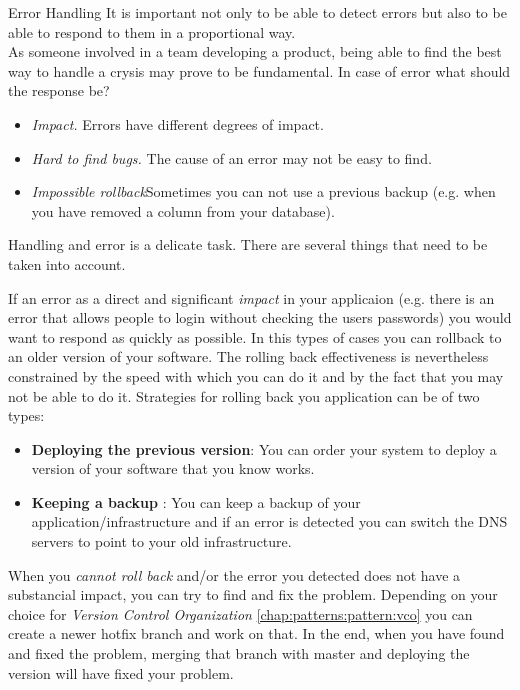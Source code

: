 \begin{pattern}{Error Handling} \label{chap:patterns:pattern:errorhandling}
    \context
    It is important not only to be able to detect errors but also to be able to respond to them in a proportional way. \\
    As someone involved in a team developing a product, being able to find the best way to handle a crysis may prove to be fundamental.
    \problem
    In case of error what should the response be?
    \forces
    \begin{itemize}
        \item \textit{Impact.} Errors have different degrees of impact.
        \item \textit{Hard to find bugs.} The cause of an error may not be easy to find.
        \item \textit{Impossible rollback}Sometimes you can not use a previous backup (e.g. when you have removed a column from your database).
    \end{itemize}

    \solution
    Handling and error is a delicate task. There are several things that need to be taken into account.

    If an error as a direct and significant \textit{impact} in your applicaion (e.g. there is an error that allows people to login without checking the users passwords) you would want to respond as quickly as possible. In this types of cases you can rollback to an older version of your software. The rolling back effectiveness is nevertheless constrained by the speed with which you can do it and by the fact that you may not be able to do it. Strategies for rolling back you application can be of two types:
        \begin{itemize}
            \item \textbf{Deploying the previous version}: You can order your system to deploy a version of your software that you know works.
            \item \textbf{Keeping a backup} : You can keep a backup of your application/infrastructure and if an error is detected you can switch the DNS servers to point to your old infrastructure.
        \end{itemize}

        When you \textit{cannot roll back } and/or the error you detected does not have a substancial impact, you can try to find and fix the problem. Depending on your choice for \textit{Version Control Organization} \ref{chap:patterns:pattern:vco} you can create a newer hotfix branch and work on that. In the end, when you have found and fixed the problem, merging that branch with master and deploying the version will have fixed your problem.


\end{pattern}
